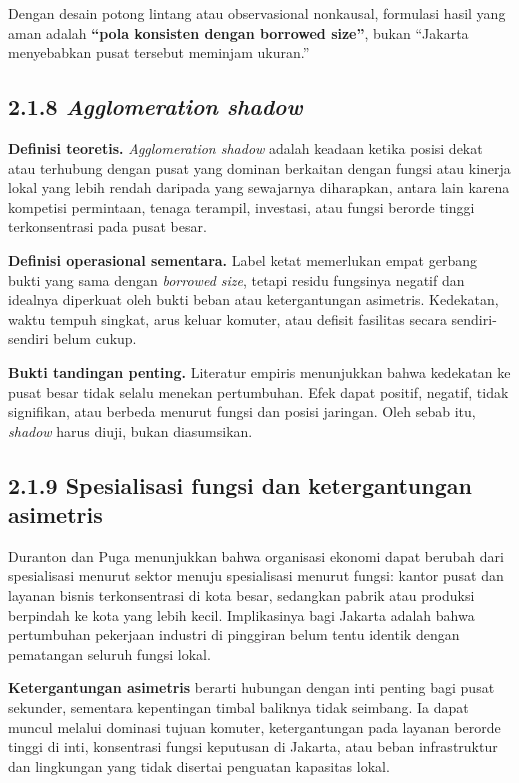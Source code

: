 \documentclass[
  indonesian,
  11pt,
  a4paper,
  oneside,
  openany]{report}
\begin{document}
Dengan desain potong lintang atau observasional nonkausal, formulasi
hasil yang aman adalah \textbf{``pola konsisten dengan borrowed size''},
bukan ``Jakarta menyebabkan pusat tersebut meminjam ukuran.''

\subsection{\texorpdfstring{2.1.8 \emph{Agglomeration
shadow}}{2.1.8 Agglomeration shadow}}\label{agglomeration-shadow}

\textbf{Definisi teoretis.} \emph{Agglomeration shadow} adalah keadaan
ketika posisi dekat atau terhubung dengan pusat yang dominan berkaitan
dengan fungsi atau kinerja lokal yang lebih rendah daripada yang
sewajarnya diharapkan, antara lain karena kompetisi permintaan, tenaga
terampil, investasi, atau fungsi berorde tinggi terkonsentrasi pada
pusat besar.

\textbf{Definisi operasional sementara.} Label ketat memerlukan empat
gerbang bukti yang sama dengan \emph{borrowed size}, tetapi residu
fungsinya negatif dan idealnya diperkuat oleh bukti beban atau
ketergantungan asimetris. Kedekatan, waktu tempuh singkat, arus keluar
komuter, atau defisit fasilitas secara sendiri-sendiri belum cukup.

\textbf{Bukti tandingan penting.} Literatur empiris menunjukkan bahwa
kedekatan ke pusat besar tidak selalu menekan pertumbuhan. Efek dapat
positif, negatif, tidak signifikan, atau berbeda menurut fungsi dan
posisi jaringan. Oleh sebab itu, \emph{shadow} harus diuji, bukan
diasumsikan.

\subsection{2.1.9 Spesialisasi fungsi dan ketergantungan
asimetris}\label{spesialisasi-fungsi-dan-ketergantungan-asimetris}

Duranton dan Puga menunjukkan bahwa organisasi ekonomi dapat berubah
dari spesialisasi menurut sektor menuju spesialisasi menurut fungsi:
kantor pusat dan layanan bisnis terkonsentrasi di kota besar, sedangkan
pabrik atau produksi berpindah ke kota yang lebih kecil. Implikasinya
bagi Jakarta adalah bahwa pertumbuhan pekerjaan industri di pinggiran
belum tentu identik dengan pematangan seluruh fungsi lokal.

\textbf{Ketergantungan asimetris} berarti hubungan dengan inti penting
bagi pusat sekunder, sementara kepentingan timbal baliknya tidak
seimbang. Ia dapat muncul melalui dominasi tujuan komuter,
ketergantungan pada layanan berorde tinggi di inti, konsentrasi fungsi
keputusan di Jakarta, atau beban infrastruktur dan lingkungan yang tidak
disertai penguatan kapasitas lokal.
\end{document}
